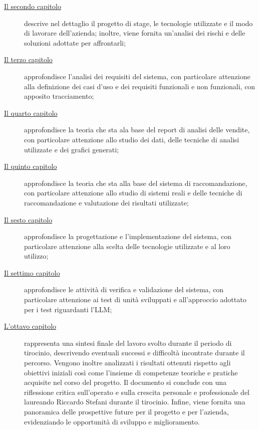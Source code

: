 \begin{description}
    \item[{\hyperref[cap:descrizione-stage]{Il secondo capitolo}}] descrive nel dettaglio il progetto di stage, le tecnologie utilizzate e il modo di lavorare dell'azienda; inoltre, viene fornita un'analisi dei rischi e delle soluzioni adottate per affrontarli;
    
    \item[{\hyperref[cap:analisi-requisiti]{Il terzo capitolo}}] approfondisce l'analisi dei requisiti del sistema, con particolare attenzione alla definizione dei casi d'uso e dei requisiti funzionali e non funzionali, con apposito tracciamento;
    
    \item[{\hyperref[cap:report-vendite]{Il quarto capitolo}}] approfondisce la teoria che sta ala base del report di analisi delle vendite, con particolare attenzione allo studio dei dati, delle tecniche di analisi utilizzate e dei grafici generati;
    
    \item[{\hyperref[cap:sistema-raccomandazione]{Il quinto capitolo}}] approfondisce la teoria che sta alla base del sistema di raccomandazione, con particolare attenzione allo studio di sistemi reali e delle tecniche di raccomandazione e valutazione dei risultati utilizzate;
    
    \item[{\hyperref[cap:progettazione-implementazione]{Il sesto capitolo}}] approfondisce la progettazione e l'implementazione del sistema, con particolare attenzione alla scelta delle tecnologie utilizzate e al loro utilizzo;
    
    \item[{\hyperref[cap:verifica-validazione]{Il settimo capitolo}}] approfondisce le attività di verifica e validazione del sistema, con particolare attenzione ai test di unità sviluppati e all'approccio adottato per i test riguardanti l'LLM;
    
    \item[{\hyperref[cap:conclusioni]{L'ottavo capitolo}}] rappresenta una sintesi finale del lavoro svolto durante il periodo di tirocinio, descrivendo eventuali successi e difficoltà incontrate durante il percorso. Vengono inoltre analizzati i risultati ottenuti rispetto agli obiettivi iniziali così come l’insieme di competenze teoriche e pratiche acquisite nel corso del progetto. Il documento si conclude con una riflessione critica sull’operato e sulla crescita personale e professionale del laureando Riccardo Stefani durante il tirocinio. Infine, viene fornita una panoramica delle prospettive future per il progetto e per l'azienda, evidenziando le opportunità di sviluppo e miglioramento.

\end{description}

